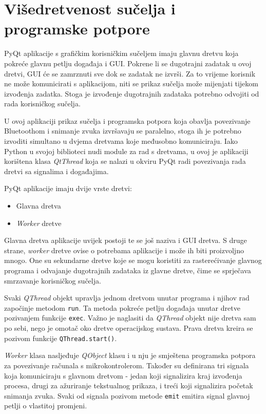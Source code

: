 \section{Višedretvenost sučelja i programske potpore}

PyQt aplikacije s grafičkim korisničkim sučeljem imaju glavnu dretvu koja pokreće glavnu petlju događaja i GUI. Pokrene li se dugotrajni zadatak u ovoj dretvi, GUI će se zamrznuti sve dok se zadatak ne izvrši. Za to vrijeme korisnik ne može komunicirati s aplikacijom, niti se prikaz sučelja može mijenjati tijekom izvođenja zadatka. Stoga je izvođenje dugotrajnih zadataka potrebno odvojiti od rada korisničkog sučelja.

U ovoj aplikaciji prikaz sučelja i programska potpora koja obavlja povezivanje Bluetoothom i snimanje zvuka izvršavaju se paralelno, stoga ih je potrebno izvoditi simultano u dvjema dretvama koje međusobno komuniciraju. Iako Python u svojoj biblioteci nudi module za rad s dretvama, u ovoj je aplikaciji korištena klasa \textit{QtThread} koja se nalazi u okviru PyQt radi povezivanja rada dretvi sa signalima i događajima.

PyQt aplikacije imaju dvije vrste dretvi:
\begin{itemize}
	\item Glavna dretva
	\item \textit{Worker} dretve
\end{itemize}

Glavna dretva aplikacije uvijek postoji te se još naziva i GUI dretva. S druge strane, \textit{worker} dretve ovise o potrebama aplikacije i može ih biti proizvoljno mnogo. One su sekundarne dretve koje se mogu koristiti za rasterećivanje glavnog programa i odvajanje dugotrajnih zadataka iz glavne dretve, čime se sprječava smrzavanje korisničkog sučelja. 

Svaki \textit{QThread} objekt upravlja jednom dretvom unutar programa i njihov rad započinje metodom \lstinline|run|. Ta metoda pokreće petlju događaja unutar dretve pozivanjem funkcije \lstinline|exec|. Važno je naglasiti da \textit{QThread} objekt nije dretva sam po sebi, nego je omotač oko dretve operacijskog sustava. Prava dretva kreira se pozivom funkcije \lstinline|QThread.start()|.

\textit{Worker} klasa nasljeđuje \textit{QObject} klasu i u nju je smještena programska potpora za povezivanje računala s mikrokontrolerom. Također su definirana tri signala koja komuniciraju s glavnom dretvom - jedan koji signalizira kraj izvođenja procesa, drugi za ažuriranje tekstualnog prikaza, i treći koji signalizira početak snimanja zvuka. Svaki od signala pozivom metode \lstinline|emit| emitira signal glavnoj petlji o vlastitoj promjeni. 

